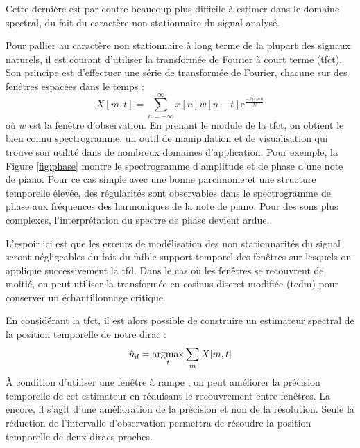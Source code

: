 Cette dernière est par contre beaucoup plus difficile à estimer dans le domaine spectral, du fait du caractère non stationnaire du signal analysé.


Pour pallier au caractère non stationnaire à long terme de la plupart des signaux naturels, il est courant d'utiliser la transformée de Fourier à court terme (tfct). Son principe est d'effectuer une série de transformée de Fourier, chacune sur des fenêtres espacées dans le temps :
\begin{equation}
X[m, t] = \sum_{n = - \infty}^{\infty} x[n] w[n-t] \mathrm{e}^{\frac{-2 \mathrm{j}  \pi m n}{N}}
\end{equation}
où $w$ est la fenêtre d'observation. En prenant le module de la tfct, on obtient le bien connu spectrogramme, un outil de manipulation et de visualisation qui trouve son utilité dans de nombreux domaines d'application. Pour exemple, la Figure \ref{fig:phase} montre le spectrogramme d'amplitude et de phase d'une note de piano. Pour ce cas simple avec une bonne parcimonie et une structure temporelle élevée, des régularités sont observables dans le spectrogramme de phase aux fréquences des harmoniques de la note de piano. Pour des sons plus complexes, l'interprétation du spectre de phase devient ardue.


L'espoir ici est que les erreurs de modélisation des non stationnarités du signal seront négligeables du fait du faible support temporel des fenêtres sur lesquels on applique successivement la tfd. Dans le cas où les fenêtres se recouvrent de moitié, on peut utiliser la transformée en cosinus discret modifiée (tcdm) pour conserver un échantillonnage critique.~\cite{princen1986analysis}

En considérant la tfct, il est alors possible de construire un estimateur \og spectral \fg de la position temporelle de notre dirac :
\begin{equation}
\hat{n}_d = \operatorname*{argmax}_t \sum_m X[m, t]
\end{equation}
\`A condition d'utiliser une fenêtre \fg à rampe \og, on peut améliorer la précision temporelle de cet estimateur en réduisant le recouvrement entre fenêtres. La encore, il s'agit d'une amélioration de la précision et non de la résolution. Seule la réduction de l'intervalle d'observation permettra de résoudre la position temporelle de deux diracs proches.

